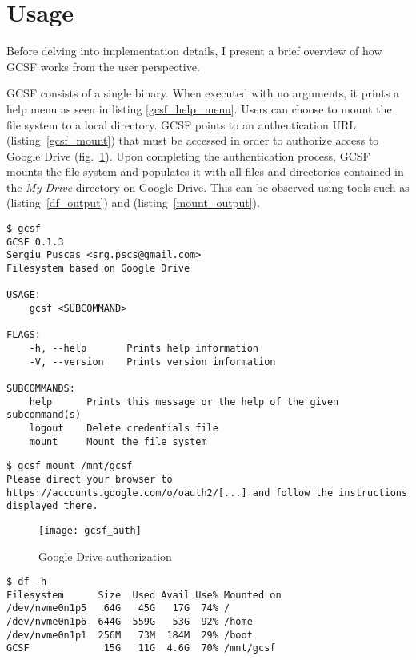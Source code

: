 \section{Usage}

Before delving into implementation details, I present a brief overview of how GCSF works from the user perspective.

GCSF consists of a single binary. When executed with no arguments, it prints a help menu as seen in listing \ref{gcsf_help_menu}. Users can choose to mount the file system to a local directory. GCSF points to an authentication URL (listing~\ref{gcsf_mount}) that must be accessed in order to authorize access to Google Drive (fig.~\ref{fig:drive_auth}). Upon completing the authentication process, GCSF mounts the file system and populates it with all files and directories contained in the \emph{My Drive} directory on Google Drive. This can be observed using tools such as  (listing~\ref{df_output}) and  (listing~\ref{mount_output}).

\begin{lstlisting}[basicstyle=\footnotesize\ttfamily,caption=GCSF help menu,frame=single,label=gcsf_help_menu,float]
$ gcsf
GCSF 0.1.3
Sergiu Puscas <srg.pscs@gmail.com>
Filesystem based on Google Drive

USAGE:
    gcsf <SUBCOMMAND>

FLAGS:
    -h, --help       Prints help information
    -V, --version    Prints version information

SUBCOMMANDS:
    help      Prints this message or the help of the given subcommand(s)
    logout    Delete credentials file
    mount     Mount the file system
\end{lstlisting}

\begin{lstlisting}[basicstyle=\footnotesize\ttfamily,caption=GCSF mount,frame=single,label=gcsf_mount,float]
$ gcsf mount /mnt/gcsf
Please direct your browser to https://accounts.google.com/o/oauth2/[...] and follow the instructions displayed there.
\end{lstlisting}

\begin{figure}[bpt]
\centering
\texttt{[image: gcsf\_auth]}
\caption{Google Drive authorization}
\label{fig:drive_auth}
\end{figure}

\begin{lstlisting}[basicstyle=\footnotesize\ttfamily,caption=Size and capacity of mounted file systems,frame=single,label=df_output,float]
$ df -h
Filesystem      Size  Used Avail Use% Mounted on
/dev/nvme0n1p5   64G   45G   17G  74% /
/dev/nvme0n1p6  644G  559G   53G  92% /home
/dev/nvme0n1p1  256M   73M  184M  29% /boot
GCSF             15G   11G  4.6G  70% /mnt/gcsf
\end{lstlisting}

